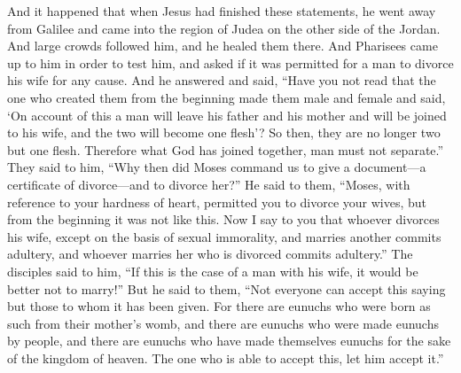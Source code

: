 \begin{biblechapter} %
 And it happened that when Jesus had finished these statements, he went away from Galilee and came into the region of Judea on the other side of the Jordan.
\verse And large crowds followed him, and he healed them there.
\verse And Pharisees came up to him in order to test him, and asked if it was permitted for a man to divorce his wife for any cause.
\verse And he answered and said, “Have you not read that the one who created them from the beginning made them male and female
\verse and said, ‘On account of this a man will leave his father and his mother and will be joined to his wife, and the two will become one flesh’?
\verse So then, they are no longer two but one flesh. Therefore what God has joined together, man must not separate.”
\verse They said to him, “Why then did Moses command us to give a document—a certificate of divorce—and to divorce her?”
\verse He said to them, “Moses, with reference to your hardness of heart, permitted you to divorce your wives, but from the beginning it was not like this.
\verse Now I say to you that whoever divorces his wife, except on the basis of sexual immorality, and marries another commits adultery, and whoever marries her who is divorced commits adultery.”
\verse The disciples said to him, “If this is the case of a man with his wife, it would be better not to marry!”
\verse But he said to them, “Not everyone can accept this saying but those to whom it has been given.
\verse For there are eunuchs who were born as such from their mother’s womb, and there are eunuchs who were made eunuchs by people, and there are eunuchs who have made themselves eunuchs for the sake of the kingdom of heaven. The one who is able to accept this, let him accept it.”

\end{biblechapter}
